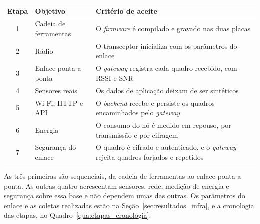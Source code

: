 \begin{quadro}[htb]
\centering
\caption{Etapas de construção da infraestrutura e critérios de aceite}
\label{qua:etapas_infra}
\small
\begin{tabular}{clp{}}
\hline
\textbf{Etapa} & \textbf{Objetivo} & \textbf{Critério de aceite} \\
\hline
1 & Cadeia de ferramentas & O \textit{firmware} é compilado e gravado nas duas placas \\
2 & Rádio & O transceptor inicializa com os parâmetros do enlace \\
3 & Enlace ponta a ponta & O \textit{gateway} registra cada quadro recebido, com RSSI e SNR \\
4 & Sensores reais & Os dados de aplicação deixam de ser sintéticos \\
5 & Wi-Fi, HTTP e API & O \textit{backend} recebe e persiste os quadros encaminhados pelo \textit{gateway} \\
6 & Energia & O consumo do nó é medido em repouso, por transmissão e por cifragem \\
7 & Segurança do enlace & O quadro é cifrado e autenticado, e o \textit{gateway} rejeita quadros forjados e repetidos \\
\hline
\end{tabular}
\end{quadro}

As três primeiras são sequenciais, da cadeia de ferramentas ao enlace ponta a ponta. As outras quatro acrescentam sensores, rede, medição de energia e segurança sobre essa base e não dependem umas das outras. Os parâmetros do enlace e as coletas realizadas estão na Seção~\ref{sec:resultados_infra}, e a cronologia das etapas, no Quadro~\ref{qua:etapas_cronologia}.

